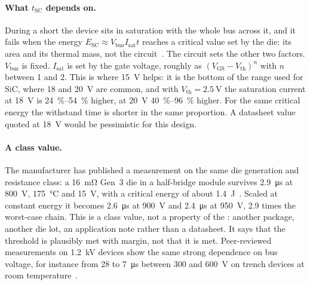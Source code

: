 \paragraph{What $t_\mathrm{SC}$ depends on.} During a short the device
sits in saturation with the whole bus across it, and it fails when the
energy $E_\mathrm{SC} \approx V_\mathrm{bus} I_\mathrm{sat} t$ reaches a
critical value set by the die: its area and its thermal mass, not the
circuit~\cite{wolfspeed_scan}. The circuit sets the other two factors.
$V_\mathrm{bus}$ is fixed. $I_\mathrm{sat}$ is set by the gate voltage,
roughly as $(V_\mathrm{GS} - V_\mathrm{th})^n$ with $n$ between 1 and 2.
This is where \SI{+15}{\volt} helps: it is the bottom of the range used
for SiC, where \SI{+18}{} and \SI{+20}{\volt} are common, and with
$V_\mathrm{th} = \SI{2.5}{\volt}$ the saturation current at \SI{+18}{\volt}
is \SIrange{24}{54}{\percent} higher, at \SI{+20}{\volt}
\SIrange{40}{96}{\percent} higher. For the same critical energy the
withstand time is shorter in the same proportion. A datasheet value
quoted at \SI{+18}{\volt} would be pessimistic for this design.

\paragraph{A class value.} The manufacturer has published a measurement on
the same die generation and resistance class: a \SI{16}{\milli\ohm} Gen~3
die in a half-bridge module survives \SI{2.9}{\micro\second} at
\SI{800}{\volt}, \SI{175}{\celsius} and \SI{+15}{\volt}, with a critical
energy of about \SI{1.4}{\joule}~\cite{wolfspeed_scan}. Scaled at constant
energy it becomes \SI{2.6}{\micro\second} at \SI{900}{\volt} and
\SI{2.4}{\micro\second} at \SI{950}{\volt}, 2.9 times the worst-case chain.
This is a class value, not a property of the \device{}: another
package, another die lot, an application note rather than a datasheet. It
says that the threshold is plausibly met with margin, not that it is met.
Peer-reviewed measurements on \SI{1.2}{\kilo\volt} devices show the same
strong dependence on bus voltage, for instance from \SI{28}{} to
\SI{7}{\micro\second} between \SI{300}{} and \SI{600}{\volt} on trench
devices at room temperature~\cite{zou2022sc}.

